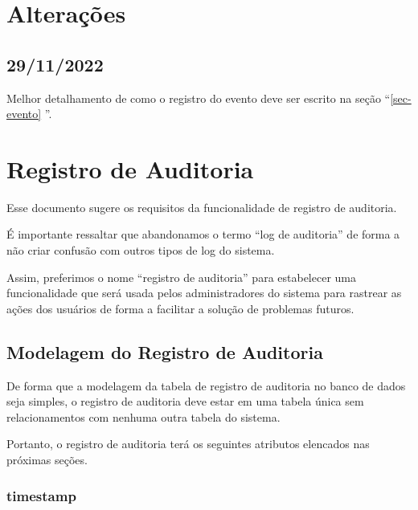 
\chapter*{Alterações}

\section*{29/11/2022}

Melhor detalhamento de como o registro do evento deve ser escrito na seção ``\ref{sec-evento} ''.


\chapter{Registro de Auditoria}
\label{detalhes:log-auditoria}

Esse documento sugere os requisitos da funcionalidade de registro de auditoria. 

É importante ressaltar que abandonamos o termo ``log de auditoria'' de forma a não criar confusão com outros tipos de log do sistema. 

Assim, preferimos o nome ``registro de auditoria'' para estabelecer uma funcionalidade que será usada pelos administradores do sistema para rastrear as ações dos usuários de forma a facilitar a solução de problemas futuros.

\section{Modelagem do Registro de Auditoria}

De forma que a modelagem da tabela de registro de auditoria no banco de dados seja simples, o registro de auditoria deve estar em uma tabela única sem relacionamentos com nenhuma outra tabela do sistema.

Portanto, o registro de auditoria terá os seguintes atributos elencados nas próximas seções.

\subsection{timestamp}

